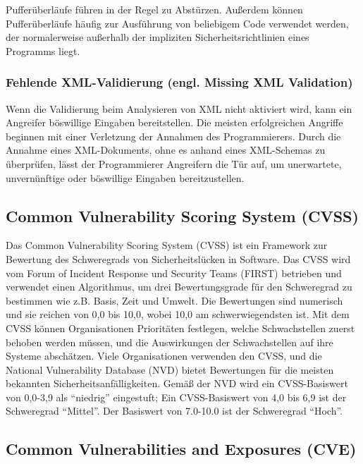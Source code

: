 Pufferüberläufe führen in der Regel zu Abstürzen. Außerdem können Pufferüberläufe häufig zur Ausführung von beliebigem Code verwendet werden, der normalerweise außerhalb der impliziten Sicherheitsrichtlinien eines Programms liegt\cite{bufferoverflow16}.

\subsubsection{Fehlende XML-Validierung (engl. Missing XML Validation)}

Wenn die Validierung beim Analysieren von XML nicht aktiviert wird, kann ein Angreifer böswillige Eingaben bereitstellen. Die meisten erfolgreichen Angriffe beginnen mit einer Verletzung der Annahmen des Programmierers. Durch die Annahme eines XML-Dokuments, ohne es anhand eines XML-Schemas zu überprüfen, lässt der Programmierer Angreifern die Tür auf, um unerwartete, unvernünftige oder böswillige Eingaben bereitzustellen\cite{bufferoverflow16}. 

\subsection{Common Vulnerability Scoring System (CVSS)}

Das Common Vulnerability Scoring System (CVSS) ist ein Framework zur Bewertung des Schweregrads von Sicherheitslücken in Software. Das CVSS wird vom Forum of Incident Response und Security Teams (FIRST) betrieben und verwendet einen Algorithmus, um drei Bewertungsgrade für den Schweregrad zu bestimmen wie z.B. Basis, Zeit und Umwelt. Die Bewertungen sind numerisch und sie reichen von 0,0 bis 10,0, wobei 10,0 am schwerwiegendsten ist. Mit dem CVSS können Organisationen Prioritäten festlegen, welche Schwachstellen zuerst behoben werden müssen, und die Auswirkungen der Schwachstellen auf ihre Systeme abschätzen. Viele Organisationen verwenden den CVSS, und die National Vulnerability Database (NVD) bietet Bewertungen für die meisten bekannten Sicherheitsanfälligkeiten. Gemäß der NVD wird ein CVSS-Basiswert von 0,0-3,9 als "`niedrig"' eingestuft; Ein CVSS-Basiswert von 4,0 bis 6,9 ist der Schweregrad "`Mittel"'. Der Basiswert von 7.0-10.0 ist der Schweregrad "`Hoch"'\cite{cvss16}.

\subsection{Common Vulnerabilities and Exposures (CVE)}


